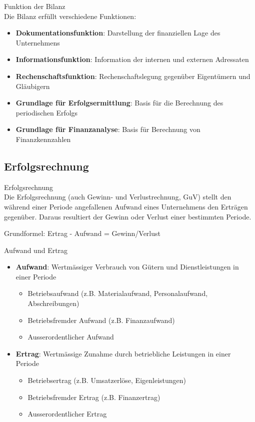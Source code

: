 \begin{concept}{Funktion der Bilanz}\\
Die Bilanz erfüllt verschiedene Funktionen:
\begin{itemize}
    \item \textbf{Dokumentationsfunktion}: Darstellung der finanziellen Lage des Unternehmens
    \item \textbf{Informationsfunktion}: Information der internen und externen Adressaten
    \item \textbf{Rechenschaftsfunktion}: Rechenschaftslegung gegenüber Eigentümern und Gläubigern
    \item \textbf{Grundlage für Erfolgsermittlung}: Basis für die Berechnung des periodischen Erfolgs
    \item \textbf{Grundlage für Finanzanalyse}: Basis für Berechnung von Finanzkennzahlen
\end{itemize}
\end{concept}

\subsection{Erfolgsrechnung}

\begin{definition}{Erfolgsrechnung}\\
Die Erfolgsrechnung (auch Gewinn- und Verlustrechnung, GuV) stellt den während einer Periode angefallenen Aufwand eines Unternehmens den Erträgen gegenüber. Daraus resultiert der Gewinn oder Verlust einer bestimmten Periode.

Grundformel: Ertrag - Aufwand = Gewinn/Verlust
\end{definition}

\begin{definition}{Aufwand und Ertrag}\\
\begin{itemize}
    \item \textbf{Aufwand}: Wertmässiger Verbrauch von Gütern und Dienstleistungen in einer Periode
    \begin{itemize}
        \item Betriebsaufwand (z.B. Materialaufwand, Personalaufwand, Abschreibungen)
        \item Betriebsfremder Aufwand (z.B. Finanzaufwand)
        \item Ausserordentlicher Aufwand
    \end{itemize}
    \item \textbf{Ertrag}: Wertmässige Zunahme durch betriebliche Leistungen in einer Periode
    \begin{itemize}
        \item Betriebsertrag (z.B. Umsatzerlöse, Eigenleistungen)
        \item Betriebsfremder Ertrag (z.B. Finanzertrag)
        \item Ausserordentlicher Ertrag
    \end{itemize}
\end{itemize}
\end{definition}

